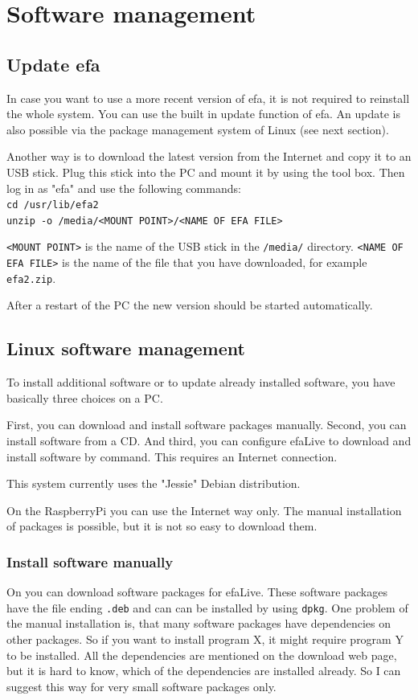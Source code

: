 \documentclass[a4paper,12pt,twoside]{article}
\begin{document}
\section{Software management}
\label{sct:software_management}
\subsection{Update efa}
\label{sct:update_efa}
In case you want to use a more recent version of efa, it is not required
to reinstall the whole system. You can use the built in update function
of efa. An update is also possible via the package management system of Linux
(see next section).

Another way is to download the latest version from the Internet
\cite{EFA1} and copy it to an USB stick. Plug this stick into the PC
and mount it by using the tool box. Then log in as
"efa" and use the following commands:
\bigskip
\\
\texttt{cd /usr/lib/efa2\\
unzip -o /media/{\textless}MOUNT POINT{\textgreater}/{\textless}NAME OF
EFA FILE{\textgreater}}

\bigskip
\texttt{{\textless}MOUNT POINT{\textgreater}} is the name of the USB stick in the
\texttt{/media/} directory. \texttt{{\textless}NAME OF EFA FILE{\textgreater}} is the
name of the file that you have downloaded, for example
\texttt{efa2.zip}.

After a restart of the PC the new version should be started
automatically.


\subsection{Linux software management}
\label{sct:linux_software}
To install additional software or to update already installed software,
you have basically three choices on a PC.

First, you can download and install software packages manually. Second,
you can install software from a CD. And third, you can configure
efaLive to download and install software by command. This requires an
Internet connection.

This system currently uses the "Jessie" Debian distribution.

On the RaspberryPi you can use the Internet way only. The manual installation
of packages is possible, but it is not so easy to download them.


\subsubsection{Install software manually}
\label{sct:software_manually}
On \cite{DEB3} you can download software packages for efaLive. These
software packages have the file ending
\texttt{.deb} and can can be installed by using
\texttt{dpkg}. One problem of the manual
installation is, that many software packages have dependencies on other
packages. So if you want to install program X, it might require program
Y to be installed. All the dependencies are mentioned on the download
web page, but it is hard to know, which of the dependencies are
installed already. So I can suggest this way for very small software
packages only.
\end{document}
